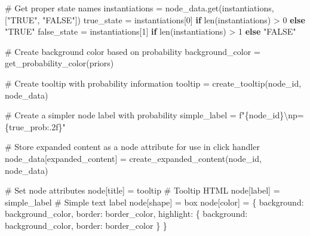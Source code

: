 \documentclass[
  11pt,
  letterpaper,
]{book}
\newenvironment{Shaded}{\begin{snugshade}}{\end{snugshade}}
\newcommand{\BuiltInTok}[1]{\textcolor[rgb]{0.00,0.23,0.31}{#1}}
\newcommand{\CharTok}[1]{\textcolor[rgb]{0.13,0.47,0.30}{#1}}
\newcommand{\CommentTok}[1]{\textcolor[rgb]{0.37,0.37,0.37}{#1}}
\newcommand{\ControlFlowTok}[1]{\textcolor[rgb]{0.00,0.23,0.31}{\textbf{#1}}}
\newcommand{\DecValTok}[1]{\textcolor[rgb]{0.68,0.00,0.00}{#1}}
\newcommand{\NormalTok}[1]{\textcolor[rgb]{0.00,0.23,0.31}{#1}}
\newcommand{\OperatorTok}[1]{\textcolor[rgb]{0.37,0.37,0.37}{#1}}
\newcommand{\SpecialCharTok}[1]{\textcolor[rgb]{0.37,0.37,0.37}{#1}}
\newcommand{\SpecialStringTok}[1]{\textcolor[rgb]{0.13,0.47,0.30}{#1}}
\newcommand{\StringTok}[1]{\textcolor[rgb]{0.13,0.47,0.30}{#1}}
\begin{document}
\begin{Shaded}
\begin{Highlighting}[]
        \CommentTok{\# Get proper state names}
\NormalTok{        instantiations }\OperatorTok{=}\NormalTok{ node\_data.get(}\StringTok{\textquotesingle{}instantiations\textquotesingle{}}\NormalTok{, [}\StringTok{"TRUE"}\NormalTok{, }\StringTok{"FALSE"}\NormalTok{])}
\NormalTok{        true\_state }\OperatorTok{=}\NormalTok{ instantiations[}\DecValTok{0}\NormalTok{] }\ControlFlowTok{if} \BuiltInTok{len}\NormalTok{(instantiations) }\OperatorTok{\textgreater{}} \DecValTok{0} \ControlFlowTok{else} \StringTok{"TRUE"}
\NormalTok{        false\_state }\OperatorTok{=}\NormalTok{ instantiations[}\DecValTok{1}\NormalTok{] }\ControlFlowTok{if} \BuiltInTok{len}\NormalTok{(instantiations) }\OperatorTok{\textgreater{}} \DecValTok{1} \ControlFlowTok{else} \StringTok{"FALSE"}

        \CommentTok{\# Create background color based on probability}
\NormalTok{        background\_color }\OperatorTok{=}\NormalTok{ get\_probability\_color(priors)}

        \CommentTok{\# Create tooltip with probability information}
\NormalTok{        tooltip }\OperatorTok{=}\NormalTok{ create\_tooltip(node\_id, node\_data)}

        \CommentTok{\# Create a simpler node label with probability}
\NormalTok{        simple\_label }\OperatorTok{=} \SpecialStringTok{f"}\SpecialCharTok{\{}\NormalTok{node\_id}\SpecialCharTok{\}}\CharTok{\textbackslash{}n}\SpecialStringTok{p=}\SpecialCharTok{\{}\NormalTok{true\_prob}\SpecialCharTok{:.2f\}}\SpecialStringTok{"}

        \CommentTok{\# Store expanded content as a node attribute for use in click handler}
\NormalTok{        node\_data[}\StringTok{\textquotesingle{}expanded\_content\textquotesingle{}}\NormalTok{] }\OperatorTok{=}\NormalTok{ create\_expanded\_content(node\_id, node\_data)}

        \CommentTok{\# Set node attributes}
\NormalTok{        node[}\StringTok{\textquotesingle{}title\textquotesingle{}}\NormalTok{] }\OperatorTok{=}\NormalTok{ tooltip  }\CommentTok{\# Tooltip HTML}
\NormalTok{        node[}\StringTok{\textquotesingle{}label\textquotesingle{}}\NormalTok{] }\OperatorTok{=}\NormalTok{ simple\_label  }\CommentTok{\# Simple text label}
\NormalTok{        node[}\StringTok{\textquotesingle{}shape\textquotesingle{}}\NormalTok{] }\OperatorTok{=} \StringTok{\textquotesingle{}box\textquotesingle{}}
\NormalTok{        node[}\StringTok{\textquotesingle{}color\textquotesingle{}}\NormalTok{] }\OperatorTok{=}\NormalTok{ \{}
            \StringTok{\textquotesingle{}background\textquotesingle{}}\NormalTok{: background\_color,}
            \StringTok{\textquotesingle{}border\textquotesingle{}}\NormalTok{: border\_color,}
            \StringTok{\textquotesingle{}highlight\textquotesingle{}}\NormalTok{: \{}
                \StringTok{\textquotesingle{}background\textquotesingle{}}\NormalTok{: background\_color,}
                \StringTok{\textquotesingle{}border\textquotesingle{}}\NormalTok{: border\_color}
\NormalTok{            \}}
\NormalTok{        \}}


\end{Highlighting}
\end{Shaded}
\end{document}
